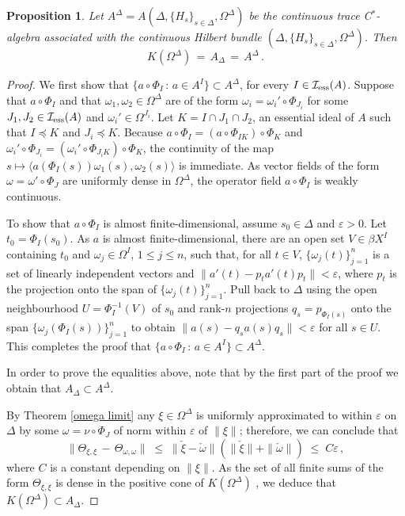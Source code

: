 \documentclass{amsart}
\newtheorem{proposition}[theorem]{Proposition}
\theoremstyle{definition}
\theoremstyle{remark}
\begin{document}
\begin{proposition}\label{they are equal}  Let $A^\Delta=A\left(\Delta, \{H_s\}_{s\in\Delta}, \Omega^\Delta\right)$ be
the continuous trace C$^*$-algebra associated with the continuous Hilbert bundle
$(\Delta, \{H_s\}_{s\in\Delta}, \Omega^\Delta)$. Then
\[
K(\Omega^\Delta)\,=\,A_\Delta \,= \,A^\Delta\,.
\]
\end{proposition}

\begin{proof} We first show that $\{a\circ\Phi_I\,:\,a\in A^I\}\subset A^\Delta$, for every $I\in \mathcal I_{\rm ess}(A)$. Suppose that $a\circ\Phi_I$ and that $\omega_1,\omega_2\in\Omega^\Delta$ are of the form $\omega_i=\omega_i'\circ\Phi_{J_i}$
for some $J_1,J_2\in \mathcal I_{\rm ess}(A)$ and $\omega_i'\in\Omega^{J_i}$. Let $K=I\cap J_1\cap J_2$, an essential ideal of $A$ such that $I\preccurlyeq K$ and $J_i\preccurlyeq K$.
Because $a\circ\Phi_I=(a\circ\Phi_{IK})\circ\Phi_K$ and $\omega_i'\circ\Phi_{J_i}=(\omega_i'\circ\Phi_{J_iK})\circ\Phi_K$, the continuity of the map
$s\mapsto\langle a\left(\Phi_I(s)\right)\omega_1(s),\omega_2(s)\rangle$ is immediate. As vector fields of the form $\omega=\omega'\circ\Phi_{J}$ are
uniformly dense in $\Omega^\Delta$, the operator field $a\circ\Phi_I$ is weakly continuous.

To show that $a\circ\Phi_I$ is almost finite-dimensional, assume $s_0\in \Delta$ and $\varepsilon>0$.
Let $t_0=\Phi_I(s_0)$. As $a$ is almost finite-dimensional, there
are an open set $V\in\beta X^I$ containing $t_0$ and $\omega_j\in\Omega^I$, $1\leq j\leq n$, such that, for all $t\in V$,
$\{\omega_j(t)\}_{j=1}^n$
is a set of linearly independent vectors and $\|a'(t)-p_ta'(t)p_t\|<\varepsilon$, where $p_t$ is the projection onto the span of
$\{\omega_j(t)\}_{j=1}^n$. Pull back to $\Delta$ using the open neighbourhood $U=\Phi_I^{-1}(V)$ of $s_0$
and rank-$n$ projections $q_s=p_{\Phi_I(s)}$ onto the span $\{\omega_j(\Phi_I(s))\}_{j=1}^n$ to obtain $\|a(s)-q_sa(s)q_s\|<\varepsilon$
for all $s\in U$. This completes the proof that $\{a\circ\Phi_I\,:\,a\in A^I\}\subset A^\Delta$.

In order to prove the equalities above, note that by the first part of the proof
we obtain that $A_\Delta\subset A^\Delta$.

By Theorem \ref{omega limit} any $\xi\in \Omega^\Delta$ is uniformly approximated to within $\varepsilon$
on $\Delta$ by some $\omega=\nu\circ\Phi_J$ of norm within $\varepsilon$ of $\|\xi\|$; therefore, we can conclude that
\[
\|\Theta_{\xi,\xi}\,-\,\Theta_{\omega,\omega}\|\;\leq\;   \|\check{\xi}-\check{\omega}\|(\|\check{\xi}\|+\|\check{\omega}\|)\;\leq\; C\varepsilon\,,
\]
where $C$ is a constant depending on $\|\xi\|$. As the set of all finite sums of the form $\Theta_{\xi,\xi}$ is dense in the positive cone of $K(\Omega^\Delta)$
\cite[Lemma 4.2]{argerami--farenick--massey2010}, we deduce that
$K(\Omega^\Delta)\subset A_\Delta$.


\end{proof}
\end{document}
